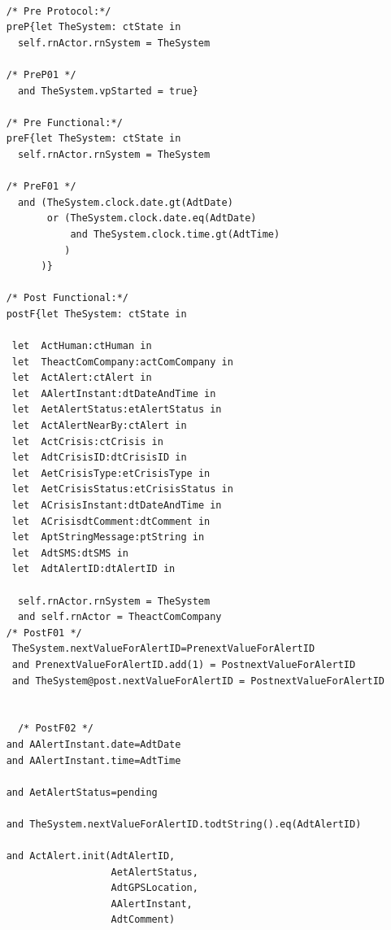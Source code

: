 	\scriptsize
	\vspace{0.5cm}
	\begin{lstlisting}[style=MessirStyle,firstnumber=auto,captionpos=b,caption={\msrmessir (MCL-oriented) specification of the operation \emph{oeAlert}.},label=OM-actComCompany-oeAlert-MCL-LST]

	/* Pre Protocol:*/ 
	preP{let TheSystem: ctState in
	  self.rnActor.rnSystem = TheSystem
	  
	/* PreP01 */
	  and TheSystem.vpStarted = true}
	
	/* Pre Functional:*/
	preF{let TheSystem: ctState in
	  self.rnActor.rnSystem = TheSystem
	
	/* PreF01 */
	  and (TheSystem.clock.date.gt(AdtDate)
	       or (TheSystem.clock.date.eq(AdtDate)
	           and TheSystem.clock.time.gt(AdtTime)
	          )
	      )}
	
	/* Post Functional:*/ 
	postF{let TheSystem: ctState in
	  
	 let  ActHuman:ctHuman in
	 let  TheactComCompany:actComCompany in
	 let  ActAlert:ctAlert in
	 let  AAlertInstant:dtDateAndTime in
	 let  AetAlertStatus:etAlertStatus in
	 let  ActAlertNearBy:ctAlert in
	 let  ActCrisis:ctCrisis in
	 let  AdtCrisisID:dtCrisisID in
	 let  AetCrisisType:etCrisisType in
	 let  AetCrisisStatus:etCrisisStatus in
	 let  ACrisisInstant:dtDateAndTime in
	 let  ACrisisdtComment:dtComment in
	 let  AptStringMessage:ptString in
	 let  AdtSMS:dtSMS in
	 let  AdtAlertID:dtAlertID in
	 
	  self.rnActor.rnSystem = TheSystem
	  and self.rnActor = TheactComCompany
	/* PostF01 */
	 TheSystem.nextValueForAlertID=PrenextValueForAlertID
	 and PrenextValueForAlertID.add(1) = PostnextValueForAlertID
	 and TheSystem@post.nextValueForAlertID = PostnextValueForAlertID
	
	
	  /* PostF02 */
	and AAlertInstant.date=AdtDate
	and AAlertInstant.time=AdtTime
	
	and AetAlertStatus=pending
	        
	and TheSystem.nextValueForAlertID.todtString().eq(AdtAlertID)
	
	and ActAlert.init(AdtAlertID,
	                  AetAlertStatus,
	                  AdtGPSLocation,
	                  AAlertInstant,
	                  AdtComment)
	      

\end{lstlisting}
